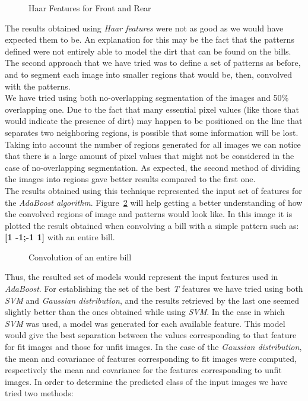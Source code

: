 \documentclass[11pt,twocolumn]{article}
\begin{document}
\begin{figure}[!hbtp]
\centering
{}
\caption{Haar Features for Front and Rear}
\label{Haar_features}
\end{figure}
	\hspace*{10px}The results obtained using \emph{Haar features} were not as good as we would have expected them to be. An explanation for this may be the fact that the patterns defined were not entirely able to model the dirt that can be found on the bills.\\
	\hspace*{10px}The second approach that we have tried was to define a set of patterns as before, and to segment each image into smaller regions that would be, then, convolved with the patterns.\\
	\hspace*{10px}We have tried using both no-overlapping segmentation of the images and 50\% overlapping one. Due to the fact that many essential pixel values (like those that would indicate the presence of dirt) may happen to be positioned on the line that separates two neighboring regions, is possible that some information will be lost. Taking into account the number of regions generated for all images we can notice that there is a large amount of pixel values that might not be considered in the case of no-overlapping segmentation. As expected, the second method of dividing the images into regions gave better results compared to the first one.\\ 
	\hspace*{10px}The results obtained using this technique represented the input set of features for the \emph{AdaBoost algorithm}. Figure~\ref{convolved} will help getting a better understanding of how the convolved regions of image and patterns would look like. In this image it is plotted the result obtained when convolving a bill with a simple pattern such as: \textbf{[1 -1;-1 1]} with an entire bill.\\
\begin{figure}[!hbtp]
\centering
{}
\caption{Convolution of an entire bill}
\label{convolved}
\end{figure} 
Thus, the resulted set of models would represent the input features used in \emph{AdaBoost}. For establishing the set of the best \emph{T} features we have tried using both \emph{SVM} and \emph{Gaussian distribution}, and the results retrieved by the last one seemed slightly better than the ones obtained while using \emph{SVM}. In the case in which \emph{SVM} was used, a model was generated for each available feature. This model would give the best separation between the values corresponding to that feature for fit images and those for unfit images. In the case of the \emph{Gaussian distribution}, the mean and covariance of features corresponding to fit images were computed, respectively the mean and covariance for the features corresponding to unfit images. In order to determine the predicted class of the input images we have tried two methods:
\end{document}
